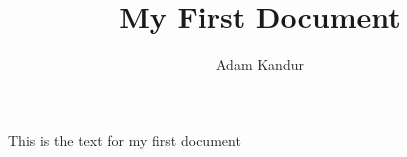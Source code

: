 \documentclass{article}
\title{My First Document}
\author{Adam Kandur}
\begin{document}
\maketitle

This is the text for my first document
\end{document}
